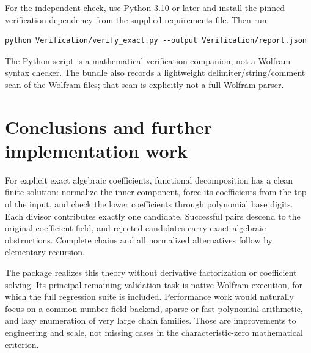 \documentclass[11pt,a4paper]{article}
\numberwithin{equation}{section}
\theoremstyle{definition}
\theoremstyle{remark}
\begin{document}
For the independent check, use Python 3.10 or later and install the pinned
verification dependency from the supplied requirements file. Then run:
\begin{lstlisting}
python Verification/verify_exact.py --output Verification/report.json
\end{lstlisting}
The Python script is a mathematical verification companion, not a Wolfram
syntax checker. The bundle also records a lightweight delimiter/string/comment
scan of the Wolfram files; that scan is explicitly not a full Wolfram parser.

\section{Conclusions and further implementation work}
\label{sec:conclusion}
For explicit exact algebraic coefficients, functional decomposition has a
clean finite solution: normalize the inner component, force its coefficients
from the top of the input, and check the lower coefficients through polynomial
base digits. Each divisor contributes exactly one candidate. Successful
pairs descend to the original coefficient field, and rejected candidates
carry exact algebraic obstructions. Complete chains and all normalized
alternatives follow by elementary recursion.

The package realizes this theory without derivative factorization or
coefficient solving. Its principal remaining validation task is native Wolfram
execution, for which the full regression suite is included. Performance work
would naturally focus on a common-number-field backend, sparse or fast
polynomial arithmetic, and lazy enumeration of very large chain families.
Those are improvements to engineering and scale, not missing cases in the
characteristic-zero mathematical criterion.
\end{document}
